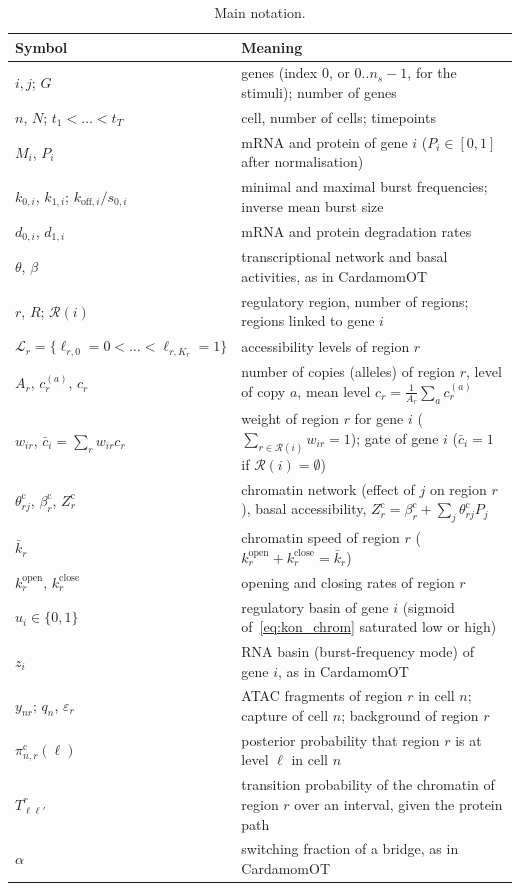 \documentclass[a4paper, 11pt]{article}
\newcommand{\kop}{k^{\mathrm{open}}}
\newcommand{\kcl}{k^{\mathrm{close}}}
\newcommand{\thc}{\theta^{\mathrm{c}}}
\newcommand{\bc}{\beta^{\mathrm{c}}}
\newcommand{\cbar}{\bar c}
\newcommand{\Lv}{\mathcal{L}}
\newcommand{\Rg}{\mathcal{R}}
\theoremstyle{plain}
\theoremstyle{remark}
\begin{document}
\begin{table}[!t]
\centering
\small
\begin{tabular}{p{4.3cm}p{10.5cm}}
\toprule
Symbol & Meaning \\
\midrule
$i, j$; $G$ & genes (index $0$, or $0..n_s-1$, for the stimuli); number of genes \\
$n$, $N$; $t_1 < \dots < t_T$ & cell, number of cells; timepoints \\
$M_i$, $P_i$ & mRNA and protein of gene $i$ ($P_i \in [0,1]$ after normalisation) \\
$k_{0,i}$, $k_{1,i}$; $k_{\mathrm{off},i}/s_{0,i}$ & minimal and maximal burst frequencies; inverse mean burst size \\
$d_{0,i}$, $d_{1,i}$ & mRNA and protein degradation rates \\
$\theta$, $\beta$ & transcriptional network and basal activities, as in CardamomOT \\
$r$, $R$; $\Rg(i)$ & regulatory region, number of regions; regions linked to gene $i$ \\
$\Lv_r = \{\ell_{r,0} = 0 < \dots < \ell_{r,K_r} = 1\}$ & accessibility levels of region $r$ \\
$A_r$, $c_r^{(a)}$, $c_r$ & number of copies (alleles) of region $r$, level of copy $a$, mean level $c_r = \frac{1}{A_r}\sum_a c_r^{(a)}$ \\
$w_{ir}$, $\cbar_i = \sum_r w_{ir}c_r$ & weight of region $r$ for gene $i$ ($\sum_{r\in\Rg(i)} w_{ir} = 1$); gate of gene $i$ ($\cbar_i = 1$ if $\Rg(i) = \emptyset$) \\
$\thc_{rj}$, $\bc_r$, $Z^{\mathrm{c}}_r$ & chromatin network (effect of $j$ on region $r$), basal accessibility, $Z^{\mathrm{c}}_r = \bc_r + \sum_j \thc_{rj}P_j$ \\
$\bar k_r$ & chromatin speed of region $r$ ($\kop_r + \kcl_r = \bar k_r$) \\
$\kop_r$, $\kcl_r$ & opening and closing rates of region $r$ \\
$u_i \in \{0,1\}$ & regulatory basin of gene $i$ (sigmoid of~\eqref{eq:kon_chrom} saturated low or high) \\
$z_i$ & RNA basin (burst-frequency mode) of gene $i$, as in CardamomOT \\
$y_{nr}$; $q_n$, $\varepsilon_r$ & ATAC fragments of region $r$ in cell $n$; capture of cell $n$; background of region $r$ \\
$\pi^{\mathrm{c}}_{n,r}(\ell)$ & posterior probability that region $r$ is at level $\ell$ in cell $n$ \\
$T^r_{\ell\ell'}$ & transition probability of the chromatin of region $r$ over an interval, given the protein path \\
$\alpha$ & switching fraction of a bridge, as in CardamomOT \\
\bottomrule
\end{tabular}
\caption{Main notation.}
\label{tab:notation}
\end{table}
\end{document}
